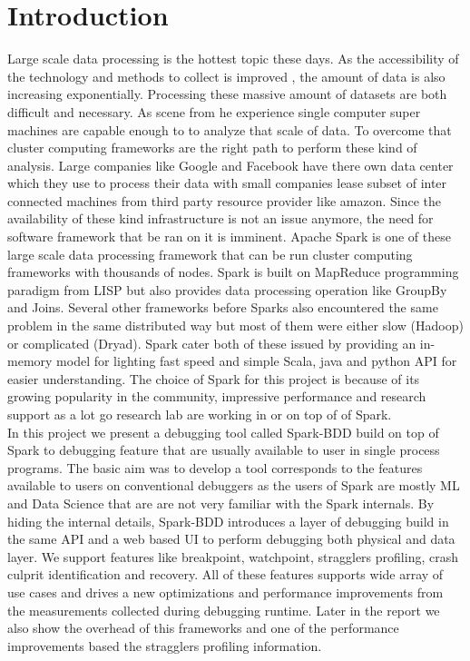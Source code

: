 \documentclass{acm_proc_article-sp}
\begin{document}
\section{Introduction}
Large scale data processing is the hottest topic these days. As the accessibility of the technology and methods to collect is improved , the amount of data is also increasing exponentially.
Processing these massive amount of datasets are both difficult and necessary. As scene from he experience single computer super machines are capable enough to to analyze that scale of data. To overcome that cluster computing frameworks are the right path to perform these kind of analysis.  Large companies like Google and Facebook have there own data center which they use to process their data with small companies lease subset of inter connected machines from third party resource provider like amazon. Since the availability of these  kind infrastructure is not an issue anymore, the need for software framework that  be ran on it is imminent. Apache Spark is one of these large scale data processing framework that can be run cluster computing frameworks with thousands of nodes. Spark is built on MapReduce programming paradigm from LISP but also provides data processing operation like GroupBy and Joins. Several other frameworks before Sparks also encountered the same problem in the same distributed way but most of them were either slow (Hadoop) or complicated (Dryad). Spark cater both of these issued by providing an in-memory model for lighting fast speed and simple Scala, java and python API for easier understanding. The choice of Spark for this project is because of its growing popularity in the community, impressive performance and research support as a lot go research lab are working in or on top of of Spark.\\
In this project we present a debugging tool called Spark-BDD build on top of Spark to debugging feature that are usually available to user in single process programs. The basic aim was to develop a tool corresponds to the features available to users on conventional debuggers as the users of Spark are mostly ML and Data Science that are are not very familiar with the Spark internals. By hiding the internal details, Spark-BDD introduces a layer of debugging build in the same API and a web based UI to perform debugging both physical and data layer. We support features like breakpoint, watchpoint, stragglers profiling, crash culprit identification and recovery. All of these features supports wide array of use cases and drives a new optimizations and performance improvements from the measurements collected during debugging runtime. Later in the report we also show the overhead of this frameworks and one of the performance improvements based the stragglers profiling information. 
\end{document}
